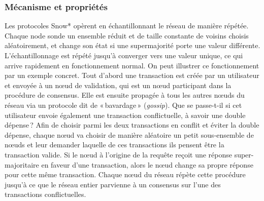 \documentclass[runningheads,francais,a4paper]{llncs}
\begin{document}
\subsubsection{Mécanisme et propriétés}
Les protocoles Snow* opèrent en échantillonnant le réseau de manière répétée. Chaque node sonde un ensemble réduit et de
taille constante de voisins choisis aléatoirement, et change son état si une supermajorité porte une valeur différente.
L'échantillonnage est répété jusqu'à converger vers une valeur unique, ce qui arrive rapidement en fonctionnement
normal. On peut illustrer ce fonctionnement par un exemple concret. Tout d'abord une transaction est créée par un
utilisateur et envoyée à un nœud de validation, qui est un nœud participant dans la procédure de consensus. Elle est
ensuite propagée à tous les autres nœuds du réseau via un protocole dit de «\,bavardage\,» (\emph{gossip}). Que se passe-t-il si
cet utilisateur envoie également une transaction conflictuelle, à savoir une double dépense\,? Afin de choisir parmi les
deux transactions en conflit et éviter la double dépense, chaque nœud va choisir de manière aléatoire un petit
sous-ensemble de nœuds et leur demander laquelle de ces transactions ils pensent être la transaction valide. Si le
nœud à l'origine de la requête reçoit une réponse super-majoritaire en faveur d'une transaction, alors le nœud change
sa propre réponse pour cette même transaction. Chaque nœud du réseau répète cette procédure jusqu'à ce que le réseau
entier parvienne à un consensus sur l'une des transactions conflictuelles.
\end{document}
